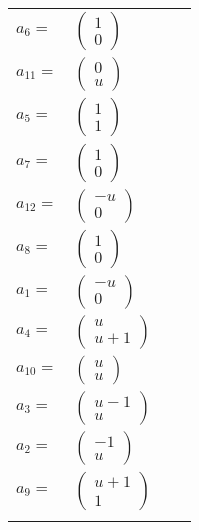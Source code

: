 \documentclass[1p]{elsarticle_modified}
\theoremstyle{definition}
\begin{document}
\begin{tabular}{m{7pt} m{180pt} m{7pt} m{180pt} }
\flushright $a_{6}=$&$\begin{pmatrix}1\\0\end{pmatrix}$ \\
\flushright $a_{11}=$&$\begin{pmatrix}0\\u\end{pmatrix}$ \\
\flushright $a_{5}=$&$\begin{pmatrix}1\\1\end{pmatrix}$ \\
\flushright $a_{7}=$&$\begin{pmatrix}1\\0\end{pmatrix}$ \\
\flushright $a_{12}=$&$\begin{pmatrix}- u\\0\end{pmatrix}$ \\
\flushright $a_{8}=$&$\begin{pmatrix}1\\0\end{pmatrix}$ \\
\flushright $a_{1}=$&$\begin{pmatrix}- u\\0\end{pmatrix}$ \\
\flushright $a_{4}=$&$\begin{pmatrix}u\\u+1\end{pmatrix}$ \\
\flushright $a_{10}=$&$\begin{pmatrix}u\\u\end{pmatrix}$ \\
\flushright $a_{3}=$&$\begin{pmatrix}u-1\\u\end{pmatrix}$ \\
\flushright $a_{2}=$&$\begin{pmatrix}-1\\u\end{pmatrix}$ \\
\flushright $a_{9}=$&$\begin{pmatrix}u+1\\1\end{pmatrix}$\\&\end{tabular}
\end{document}
